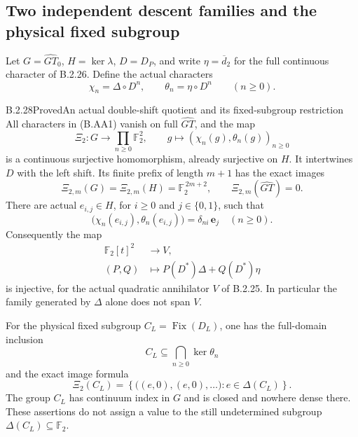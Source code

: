 \subsection{Two independent descent families and the physical fixed subgroup}

Let $G=\widehat{GT}_0$, $H=\ker\lambda$, $D=D_P$, and
write $\eta=\overline d_2$ for the full continuous
character of B.2.26.  Define the actual characters
\[
 \chi_n=\Delta\circ D^n,\qquad
 \theta_n=\eta\circ D^n\qquad(n\geq0).
 \tag{B.AA1}
\]

\begin{result}{B.2.28}{Proved}{An actual double-shift quotient and its fixed-subgroup restriction}
All characters in (B.AA1) vanish on full
$\widehat{GT}$, and the map
\[
 \Xi_2:G\longrightarrow\prod_{n\geq0}\mathbb F_2^2,
       \qquad g\longmapsto(\chi_n(g),\theta_n(g))_{n\geq0}
 \tag{B.AA2}
\]
is a continuous surjective homomorphism, already
surjective on $H$.  It intertwines $D$ with the
left shift.  Its finite prefix of length $m+1$ has
the exact images
\[
 \Xi_{2,m}(G)=\Xi_{2,m}(H)=\mathbb F_2^{\,2m+2},
                   \qquad \Xi_{2,m}(\widehat{GT})=0.
 \tag{B.AA3}
\]
There are actual $e_{i,j}\in H$, for $i\geq0$
and $j\in\{0,1\}$, such that
\[
 \bigl(\chi_n(e_{i,j}),\theta_n(e_{i,j})\bigr)
                  =\delta_{ni}\,\mathbf e_j
                         \quad(n\geq0).
 \tag{B.AA4}
\]
Consequently the map
\[
 \begin{aligned}
 \mathbb F_2[t]^2&\longrightarrow V,\\
 (P,Q)&\longmapsto P(D^*)\Delta+Q(D^*)\eta
 \end{aligned}
 \tag{B.AA5}
\]
is injective, for the actual quadratic annihilator
$V$ of B.2.25.  In particular the family generated
by $\Delta$ alone does not span $V$.

For the physical fixed subgroup $C_L=\operatorname{Fix}(D_L)$,
one has the full-domain inclusion
\[
             C_L\subseteq\bigcap_{n\geq0}\ker\theta_n
 \tag{B.AA6}
\]
and the exact image formula
\[
 \Xi_2(C_L)=
 \left\{\bigl((e,0),(e,0),\ldots\bigr):
                                      e\in\Delta(C_L)\right\}.
 \tag{B.AA7}
\]
The group $C_L$ has continuum index in $G$ and is
closed and nowhere dense there.  These assertions
do not assign a value to the still undetermined
subgroup $\Delta(C_L)\subseteq\mathbb F_2$.
\end{result}
